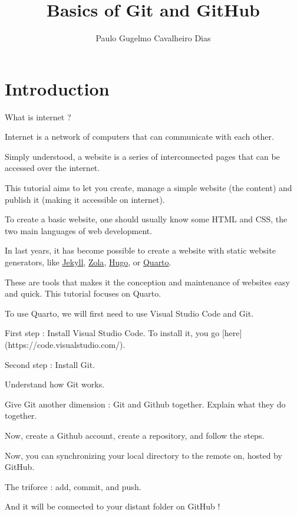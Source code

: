\documentclass{beamer}
\title{Basics of Git and GitHub}
\author{Paulo Gugelmo Cavalheiro Dias}
\begin{document}
\section{Introduction}

\begin{frame}
    What is internet ? 

    Internet is a network of computers that can communicate with each other.

    Simply understood, a website is a series of interconnected pages that can be accessed over the internet.

    This tutorial aims to let you create, manage a simple website (the content) and publish it (making it accessible on internet). 
\end{frame}

\begin{frame}
    To create a basic website, one should usually know some HTML and CSS, the two main languages of web development.

    In last years, it has become possible to create a website with static website generators, like \hyperlink{https://jekyllrb.com}{Jekyll}, \hyperlink{https://www.getzola.org/}{Zola}, \hyperlink{https://www.gohugo.io/}{Hugo}, or \hyperlink{http://quarto.org}{Quarto}.

    These are tools that makes it the conception and maintenance of websites easy and quick. This tutorial focuses on Quarto.

    To use Quarto, we will first need to use Visual Studio Code and Git.
\end{frame}

\begin{frame}
    First step : Install Visual Studio Code.
    To install it, you go [here](https://code.visualstudio.com/).
\end{frame}

\begin{frame}
    Second step : Install Git.
\end{frame}

\begin{frame}
    Understand how Git works.
\end{frame}

\begin{frame}
    Give Git another dimension : Git and Github together. Explain what they do together. 
\end{frame}

\begin{frame}
    Now, create a Github account, create a repository, and follow the steps. 
\end{frame}

\begin{frame}
    Now, you can synchronizing your local directory to the remote on, hosted by GitHub.
\end{frame}

\begin{frame}
    The triforce : add, commit, and push.
\end{frame}

\begin{frame}
    And it will be connected to your distant folder on GitHub ! 
\end{frame}
\end{document}
